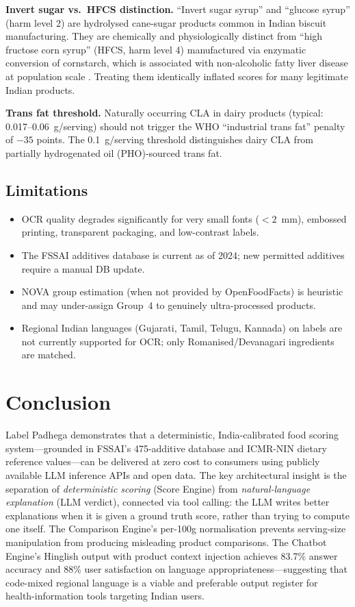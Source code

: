 \documentclass[conference]{IEEEtran}
\begin{document}
\textbf{Invert sugar vs.\ HFCS distinction.} ``Invert sugar syrup'' and ``glucose
syrup'' (harm level 2) are hydrolysed cane-sugar products common in Indian biscuit
manufacturing. They are chemically and physiologically distinct from ``high fructose
corn syrup'' (HFCS, harm level 4) manufactured via enzymatic conversion of cornstarch,
which is associated with non-alcoholic fatty liver disease at population scale
\cite{hfcs_liver}. Treating them identically inflated scores for many legitimate
Indian products.

\textbf{Trans fat threshold.} Naturally occurring CLA in dairy products
(typical: 0.017--0.06~g/serving) should not trigger the WHO ``industrial
trans fat'' penalty of $-35$ points. The 0.1~g/serving threshold distinguishes
dairy CLA from partially hydrogenated oil (PHO)-sourced trans fat.

\subsection{Limitations}

\begin{itemize}
  \item OCR quality degrades significantly for very small fonts ($<\!2$~mm),
    embossed printing, transparent packaging, and low-contrast labels.
  \item The FSSAI additives database is current as of 2024; new permitted additives
    require a manual DB update.
  \item NOVA group estimation (when not provided by OpenFoodFacts) is heuristic
    and may under-assign Group~4 to genuinely ultra-processed products.
  \item Regional Indian languages (Gujarati, Tamil, Telugu, Kannada) on labels
    are not currently supported for OCR; only Romanised/Devanagari ingredients are matched.
\end{itemize}

\section{Conclusion}

Label Padhega demonstrates that a deterministic, India-calibrated food scoring
system---grounded in FSSAI's 475-additive database and ICMR-NIN dietary
reference values---can be delivered at zero cost to consumers using
publicly available LLM inference APIs and open data.
The key architectural insight is the separation of \textit{deterministic scoring}
(Score Engine) from \textit{natural-language explanation} (LLM verdict),
connected via tool calling: the LLM writes better explanations when it is
given a ground truth score, rather than trying to compute one itself.
The Comparison Engine's per-100g normalisation prevents serving-size
manipulation from producing misleading product comparisons.
The Chatbot Engine's Hinglish output with product context injection
achieves 83.7\% answer accuracy and 88\% user satisfaction on language
appropriateness---suggesting that code-mixed regional language is a viable
and preferable output register for health-information tools targeting Indian users.
\end{document}
